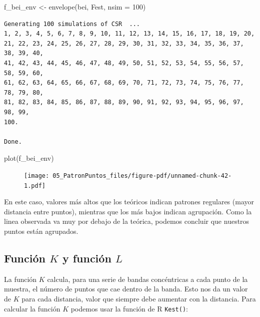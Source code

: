 \documentclass[
  letterpaper,
  DIV=11,
  numbers=noendperiod]{scrreprt}
\newenvironment{Shaded}{\begin{snugshade}}{\end{snugshade}}
\newcommand{\AttributeTok}[1]{\textcolor[rgb]{0.40,0.45,0.13}{#1}}
\newcommand{\DecValTok}[1]{\textcolor[rgb]{0.68,0.00,0.00}{#1}}
\newcommand{\FunctionTok}[1]{\textcolor[rgb]{0.28,0.35,0.67}{#1}}
\newcommand{\NormalTok}[1]{\textcolor[rgb]{0.00,0.23,0.31}{#1}}
\newcommand{\OtherTok}[1]{\textcolor[rgb]{0.00,0.23,0.31}{#1}}
\begin{document}
\begin{Shaded}
\begin{Highlighting}[]
\NormalTok{f\_bei\_env }\OtherTok{\textless{}{-}} \FunctionTok{envelope}\NormalTok{(bei, Fest, }\AttributeTok{nsim =} \DecValTok{100}\NormalTok{)}
\end{Highlighting}
\end{Shaded}

\begin{verbatim}
Generating 100 simulations of CSR  ...
1, 2, 3, 4, 5, 6, 7, 8, 9, 10, 11, 12, 13, 14, 15, 16, 17, 18, 19, 20,
21, 22, 23, 24, 25, 26, 27, 28, 29, 30, 31, 32, 33, 34, 35, 36, 37, 38, 39, 40,
41, 42, 43, 44, 45, 46, 47, 48, 49, 50, 51, 52, 53, 54, 55, 56, 57, 58, 59, 60,
61, 62, 63, 64, 65, 66, 67, 68, 69, 70, 71, 72, 73, 74, 75, 76, 77, 78, 79, 80,
81, 82, 83, 84, 85, 86, 87, 88, 89, 90, 91, 92, 93, 94, 95, 96, 97, 98, 99, 
100.

Done.
\end{verbatim}

\begin{Shaded}
\begin{Highlighting}[]
\FunctionTok{plot}\NormalTok{(f\_bei\_env)}
\end{Highlighting}
\end{Shaded}

\begin{figure}[H]

{\centering \texttt{[image: 05\_PatronPuntos\_files/figure-pdf/unnamed-chunk-42-1.pdf]}

}

\end{figure}

En este caso, valores más altos que los teóricos indican patrones
regulares (mayor distancia entre puntos), mientras que los más bajos
indican agrupación. Como la linea observada va muy por debajo de la
teórica, podemos concluir que nuestros puntos están agrupados.

\hypertarget{funciuxf3n-k-y-funciuxf3n-l}{%
\subsection{\texorpdfstring{Función \(K\) y función
\(L\)}{Función K y función L}}\label{funciuxf3n-k-y-funciuxf3n-l}}

La función \(K\) calcula, para una serie de bandas concéntricas a cada
punto de la muestra, el número de puntos que cae dentro de la banda.
Esto nos da un valor de \(K\) para cada distancia, valor que siempre
debe aumentar con la distancia. Para calcular la función \(K\) podemos
usar la función de R \texttt{Kest()}:
\end{document}
